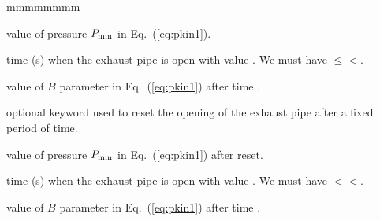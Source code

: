 \begin{ListeDeDescription}{mmmmmmmm}
\item[\dusa{p2}] value of pressure $P_{\rm min}$ in Eq.~(\ref{eq:pkin1}).

\item[\dusa{tb1}] time (s) when the exhaust pipe is open with value . We must have $\le$$<$.

\item[\dusa{bval1}] value of $B$ parameter in Eq.~(\ref{eq:pkin1}) after time .

\item[\moc{RESET}] optional keyword used to reset the opening of the exhaust pipe after a fixed period of time.

\item[\dusa{p3}] value of pressure $P_{\rm min}$ in Eq.~(\ref{eq:pkin1}) after reset.

\item[\dusa{tb2}] time (s) when the exhaust pipe is open with value . We must have $<$$<$.

\item[\dusa{bval2}] value of $B$ parameter in Eq.~(\ref{eq:pkin1}) after time .

\end{ListeDeDescription}
\clearpage
